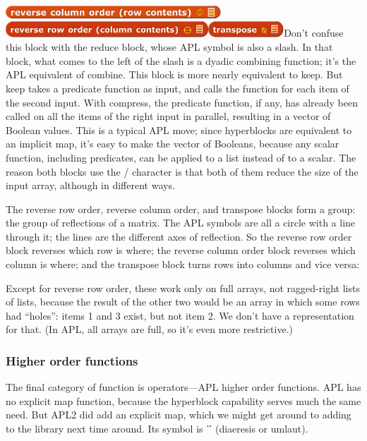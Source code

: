 \includegraphics[width=3.175in,height=0.18333in]{media/image1319.png}\includegraphics[width=2.99444in,height=0.23333in]{media/image1320.png}\includegraphics[width=1.11181in,height=0.23333in]{media/image1321.png}Don't
confuse this block with the reduce block, whose APL symbol is also a
slash. In that block, what comes to the left of the slash is a dyadic
combining function; it's the APL equivalent of combine. This block is
more nearly equivalent to keep. But keep takes a predicate function as
input, and calls the function for each item of the second input. With
compress, the predicate function, if any, has already been called on all
the items of the right input in parallel, resulting in a vector of
Boolean values. This is a typical APL move; since hyperblocks are
equivalent to an implicit map, it's easy to make the vector of Booleans,
because any scalar function, including predicates, can be applied to a
list instead of to a scalar. The reason both blocks use the / character
is that both of them reduce the size of the input array, although in
different ways.

The reverse row order, reverse column order, and transpose blocks form a
group: the group of reflections of a matrix. The APL symbols are all a
circle with a line through it; the lines are the different axes of
reflection. So the reverse row order block reverses which row is where;
the reverse column order block reverses which column is where; and the
transpose block turns rows into columns and vice versa:

Except for reverse row order, these work only on full arrays, not
ragged-right lists of lists, because the result of the other two would
be an array in which some rows had ``holes'': items 1 and 3 exist, but
not item 2. We don't have a representation for that. (In APL, all arrays
are full, so it's even more restrictive.)

\subsubsection{Higher order functions}\label{higher-order-functions}

The final category of function is operators---APL higher order
functions. APL has no explicit map function, because the hyperblock
capability serves much the same need. But APL2 did add an explicit map,
which we might get around to adding to the library next time around. Its
symbol is \textbf{¨} (diaeresis or umlaut).


